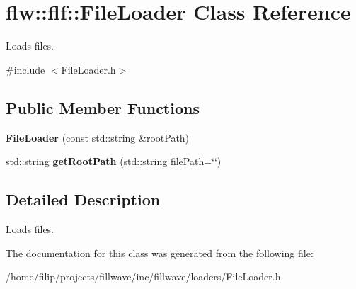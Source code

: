 \hypertarget{classflw_1_1flf_1_1FileLoader}{}\section{flw\+:\+:flf\+:\+:File\+Loader Class Reference}
\label{classflw_1_1flf_1_1FileLoader}


Loads files.  




{\ttfamily \#include $<$File\+Loader.\+h$>$}

\subsection*{Public Member Functions}
\begin{DoxyCompactItemize}
\item 
\mbox{\label{classflw_1_1flf_1_1FileLoader_a600a5a31f5658122a037e464f59010da}} 
{\bfseries File\+Loader} (const std\+::string \&root\+Path)
\item 
\mbox{\label{classflw_1_1flf_1_1FileLoader_a9cdf33046f1616a0e75ae1eea9e06448}} 
std\+::string {\bfseries get\+Root\+Path} (std\+::string file\+Path=\char`\"{}\char`\"{})
\end{DoxyCompactItemize}


\subsection{Detailed Description}
Loads files. 

The documentation for this class was generated from the following file\+:\begin{DoxyCompactItemize}
\item 
/home/filip/projects/fillwave/inc/fillwave/loaders/File\+Loader.\+h\end{DoxyCompactItemize}
